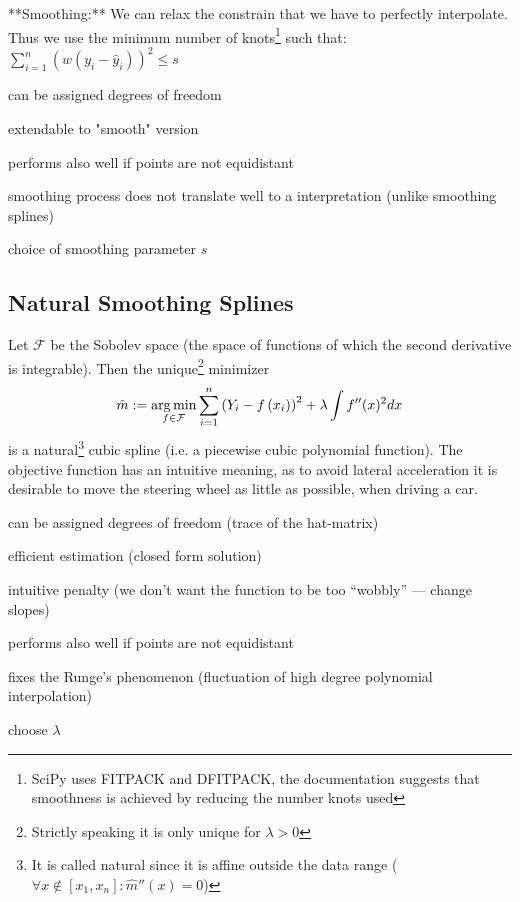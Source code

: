 **Smoothing:**
We can relax the constrain that we have to perfectly interpolate. Thus we use the minimum number of knots\footnote{SciPy uses FITPACK and DFITPACK, the documentation suggests that smoothness is achieved by reducing the number knots used} such that:
$\sum_{i=1}^n(w (y_i - \hat y_i))^2 \leq s$
\begin{my_pros_cons_table}{
    \item can be assigned degrees of freedom
    \item extendable to "smooth" version
    \item performs also well if points are not equidistant
  }{
    \item smoothing process does not translate well to a interpretation (unlike smoothing splines)
    \item choice of smoothing parameter $s$
  }
\end{my_pros_cons_table}


\subsection{Natural Smoothing Splines}
\label{sec:Natural}
Let $\mathcal F$ be the Sobolev space (the space of functions of which the second derivative is integrable). Then the unique\footnote{Strictly speaking it is only unique for $\lambda > 0$} minimizer
$$\hat m :=\operatorname*{arg\, min}_{f \in \mathcal F} \sum_{i=1}^{n}\left(Y_{i}-{f}\left(x_{i}\right)\right)^{2}+\lambda \int {f}^{\prime \prime}(x)^{2} d x$$
is a natural\footnote{It is called natural since it is affine outside the data range ($\forall x\notin [x_1, x_n]:\hat m''(x) = 0$)} cubic spline (i.e. a piecewise cubic polynomial function).
The objective function has an intuitive meaning, as to avoid lateral acceleration it is desirable to move the steering wheel as little as possible, when driving a car.


\begin{my_pros_cons_table}{
    \item can be assigned degrees of freedom (trace of the hat-matrix)
    \item efficient estimation (closed form solution)
    \item intuitive penalty (we don't want the function to be too ``wobbly'' --- change slopes)
    \item performs also well if points are not equidistant
    \item fixes the Runge's phenomenon (fluctuation of high degree polynomial interpolation)
  }{
    \item choose $\lambda$
  }
\end{my_pros_cons_table}


